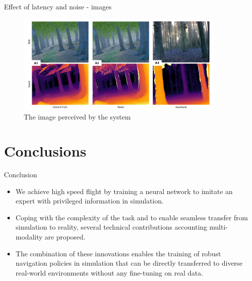 \documentclass{beamer}
\begin{document}
\begin{frame}{Effect of latency and noise - images}
	\begin{figure}
		\includegraphics[width=4in]{images/stimulation and stereo.png}
		\caption{The image perceived by the system}
	\end{figure}
\end{frame}

\section{Conclusions}
\begin{frame}{Conclusion}
	\begin{itemize}
		\item We achieve high speed flight by training a neural network to imitate an expert with privileged information in simulation.
		
		\item Coping with the complexity of the task and to enable seamless transfer from simulation to reality, several technical contributions accounting multi-modality are proposed.
		
		\item The combination of these innovations enables the training of robust navigation policies in simulation that can be directly transferred to diverse real-world environments without any fine-tuning on real data.
	\end{itemize}
	
	
\end{frame}
\end{document}
